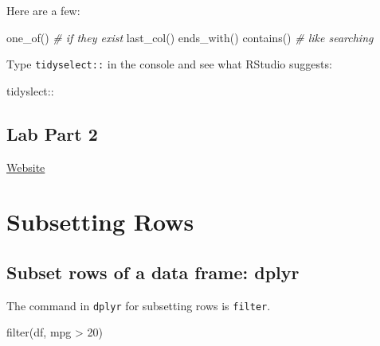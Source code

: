 \documentclass[
]{article}
\newenvironment{Shaded}{\begin{snugshade}}{\end{snugshade}}
\newcommand{\CommentTok}[1]{\textcolor[rgb]{0.56,0.35,0.01}{\textit{#1}}}
\newcommand{\DecValTok}[1]{\textcolor[rgb]{0.00,0.00,0.81}{#1}}
\newcommand{\FunctionTok}[1]{\textcolor[rgb]{0.00,0.00,0.00}{#1}}
\newcommand{\NormalTok}[1]{#1}
\newcommand{\SpecialCharTok}[1]{\textcolor[rgb]{0.00,0.00,0.00}{#1}}
\begin{document}
Here are a few:

\begin{Shaded}
\begin{Highlighting}[]
\FunctionTok{one\_of}\NormalTok{() }\CommentTok{\# if they exist}
\FunctionTok{last\_col}\NormalTok{()}
\FunctionTok{ends\_with}\NormalTok{()}
\FunctionTok{contains}\NormalTok{() }\CommentTok{\# like searching}
\end{Highlighting}
\end{Shaded}

Type \texttt{tidyselect::} in the console and see what RStudio suggests:

\begin{Shaded}
\begin{Highlighting}[]
\NormalTok{tidyslect}\SpecialCharTok{::} 
\end{Highlighting}
\end{Shaded}

\hypertarget{lab-part-2}{%
\subsection{Lab Part 2}\label{lab-part-2}}

\href{http://https://jhudatascience.org/intro_to_R_class/index.html}{Website}

\hypertarget{subsetting-rows}{%
\section{Subsetting Rows}\label{subsetting-rows}}

\hypertarget{subset-rows-of-a-data-frame-dplyr}{%
\subsection{Subset rows of a data frame:
dplyr}\label{subset-rows-of-a-data-frame-dplyr}}

The command in \texttt{dplyr} for subsetting rows is \texttt{filter}.

\begin{Shaded}
\begin{Highlighting}[]
\FunctionTok{filter}\NormalTok{(df, mpg }\SpecialCharTok{\textgreater{}} \DecValTok{20}\NormalTok{)}
\end{Highlighting}
\end{Shaded}
\end{document}
